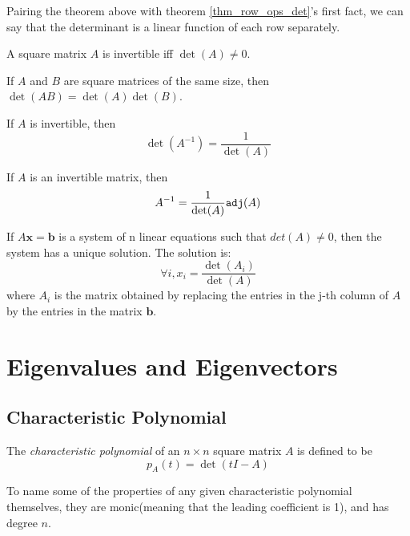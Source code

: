 \documentclass{report}
\begin{document}
			Pairing the theorem above with theorem \ref{thm_row_ops_det}'s first fact, we can say that the determinant is a linear function of each row separately.
			
			\begin{thm}
				A square matrix $A$ is invertible iff $\det(A) \ne 0$.
			\end{thm}
			
			\begin{thm}
				If $A$ and $B$ are square matrices of the same size, then $\det(AB)=\det(A)\det(B)$.
			\end{thm}
			
			\begin{thm}
				If $A$ is invertible, then
				\begin{displaymath}
					\det(A^{-1})=\frac{1}{\det(A)}
				\end{displaymath}
			\end{thm}
			
			\begin{thm}
				If $A$ is an invertible matrix, then
				\begin{displaymath}
					A^{-1}=\frac{1}{\det(A)}\verb|adj|(A)
				\end{displaymath}
			\end{thm}
			
			\begin{thm}
				If $A\bm{x}=\bm{b}$ is a system of n linear equations such that $det(A)\ne0$, then the system has a unique solution. The solution is:
				\begin{displaymath}
					\forall i, x_i=\frac{\det(A_i)}{\det(A)}
				\end{displaymath}
				where $A_i$ is the matrix obtained by replacing the entries in the j-th column of $A$ by the entries in the matrix $\bm{b}$.
			\end{thm}
		
	\section{Eigenvalues and Eigenvectors}
		\subsection{Characteristic Polynomial}
			\begin{defn}\label{def_characteristic_polynomial}
				The \emph{characteristic polynomial} of an $n \times n$ square matrix $A$ is defined to be
				\begin{displaymath}
					p_A(t)=\det(tI-A)
				\end{displaymath}
			\end{defn}
			To name some of the properties of any given characteristic polynomial themselves, they are monic(meaning that the leading coefficient is 1), and has degree $n$.
			
\end{document}
